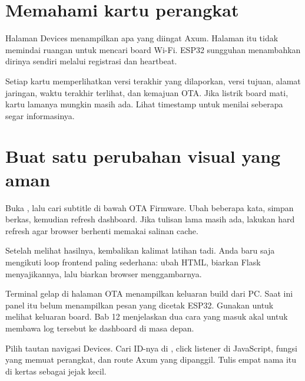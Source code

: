 \section{Memahami kartu perangkat}

Halaman Devices menampilkan apa yang diingat Axum. Halaman itu tidak memindai ruangan untuk mencari board Wi-Fi. ESP32 sungguhan menambahkan dirinya sendiri melalui registrasi dan heartbeat.

Setiap kartu memperlihatkan versi terakhir yang dilaporkan, versi tujuan, alamat jaringan, waktu terakhir terlihat, dan kemajuan OTA. Jika listrik board mati, kartu lamanya mungkin masih ada. Lihat timestamp untuk menilai seberapa segar informasinya.

\section{Buat satu perubahan visual yang aman}

Buka , lalu cari subtitle di bawah OTA Firmware. Ubah beberapa kata, simpan berkas, kemudian refresh dashboard. Jika tulisan lama masih ada, lakukan hard refresh agar browser berhenti memakai salinan cache.

Setelah melihat hasilnya, kembalikan kalimat latihan tadi. Anda baru saja mengikuti loop frontend paling sederhana: ubah HTML, biarkan Flask menyajikannya, lalu biarkan browser menggambarnya.

\begin{mentorbox}
Terminal gelap di halaman OTA menampilkan keluaran build dari PC. Saat ini panel itu belum menampilkan pesan yang dicetak ESP32. Gunakan  untuk melihat keluaran board. Bab 12 menjelaskan dua cara yang masuk akal untuk membawa log tersebut ke dashboard di masa depan.
\end{mentorbox}

\begin{checkpoint}
Pilih tautan navigasi Devices. Cari ID-nya di , click listener di JavaScript, fungsi yang memuat perangkat, dan route Axum yang dipanggil. Tulis empat nama itu di kertas sebagai jejak kecil.
\end{checkpoint}
